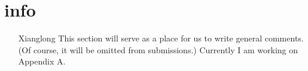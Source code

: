 \section*{info}
\begin{itemize}
	\item[Xianglong] This section will serve as a place for us to write general comments. (Of course, it will be omitted from submissions.) Currently I am working on Appendix A.
\end{itemize}

